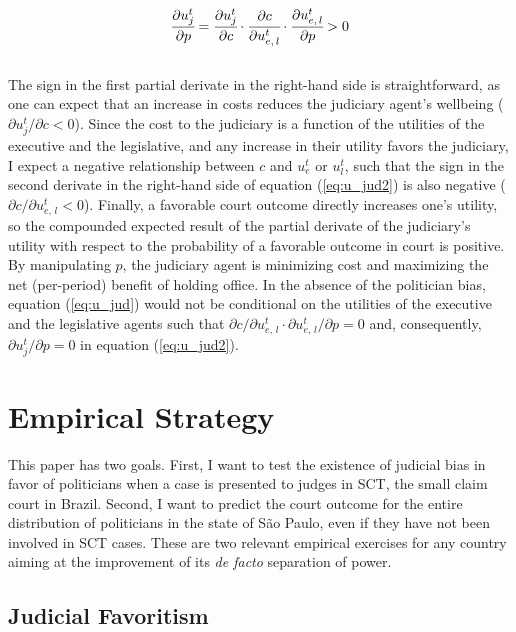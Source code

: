 \documentclass[11pt]{article}
\newcommand{\refp}[1]{(\ref{#1})}
\begin{document}
\begin{equation} \label{eq:u_jud2}
  \cfrac{\partial u_{j}^{t}}{\partial p} = \cfrac{\partial u_{j}^{t}}{\partial c} \cdot \cfrac{\partial c}{\partial u_{e, \, l}^{t}} \cdot \cfrac{\partial u_{e, \, l}^{t}}{\partial p} > 0
\end{equation} \\

The sign in the first partial derivate in the right-hand side is straightforward, as one can expect that an increase in costs reduces the judiciary agent's wellbeing ($\partial u_{j}^{t} / \partial c < 0$). Since the cost to the judiciary is a function of the utilities of the executive and the legislative, and any increase in their utility favors the judiciary, I expect a negative relationship between $c$ and $u_{e}^{t}$ or $u_{l}^{t}$, such that the sign in the second derivate in the right-hand side of equation \refp{eq:u_jud2} is also negative ($\partial c / \partial u_{e, \, l}^{t} < 0$). Finally, a favorable court outcome directly increases one's utility, so the compounded expected result of the partial derivate of the judiciary's utility with respect to the probability of a favorable outcome in court is positive. By manipulating $p$, the judiciary agent is minimizing cost and maximizing the net (per-period) benefit of holding office. In the absence of the politician bias, equation \refp{eq:u_jud} would not be conditional on the utilities of the executive and the legislative agents such that $\partial c / \partial u_{e, \, l}^{t} \cdot \partial u_{e, \, l}^{t} / \partial p = 0$ and, consequently, $\partial u_{j}^{t} / \partial p = 0$ in equation \refp{eq:u_jud2}.

\section{Empirical Strategy} \label{sec:methods_paper2}

This paper has two goals. First, I want to test the existence of judicial bias in favor of politicians when a case is presented to judges in SCT, the small claim court in Brazil. Second, I want to predict the court outcome for the entire distribution of politicians in the state of São Paulo, even if they have not been involved in SCT cases. These are two relevant empirical exercises for any country aiming at the improvement of its \emph{de facto} separation of power.

\subsection{Judicial Favoritism} \label{subsec:methods1_paper2}
\end{document}
